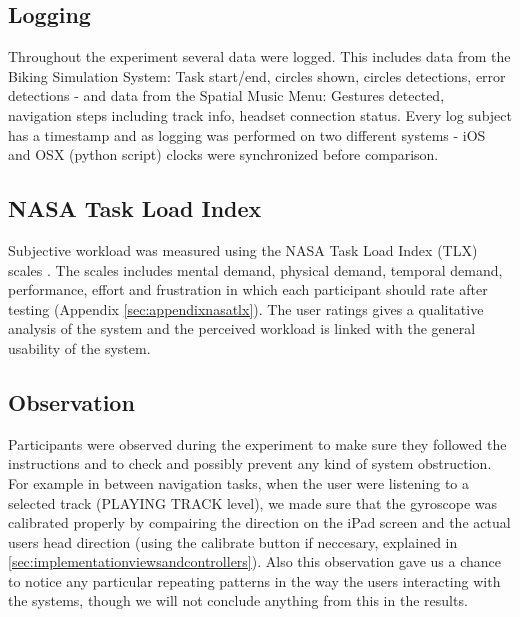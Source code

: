 \subsection{Logging}
Throughout the experiment several data were logged. This includes data from the Biking Simulation System: Task start/end, circles shown, circles detections, error detections - and data from the Spatial Music Menu: Gestures detected, navigation steps including track info, headset connection status. Every log subject has a timestamp and as logging was performed on two different systems - iOS and OSX (python script) clocks were synchronized before comparison.



\subsection{NASA Task Load Index}
Subjective workload was measured using the NASA Task Load Index (TLX) scales \cite{hart_workload_1990}. The scales includes mental demand, physical demand, temporal demand, performance, effort and frustration in which each participant should rate after testing (Appendix \ref{sec:appendixnasatlx}). The user ratings gives a qualitative analysis of the system and the perceived workload is linked with the general usability of the system.

\subsection{Observation}
Participants were observed during the experiment to make sure they followed the instructions and to check and possibly prevent any kind of system obstruction. For example in between navigation tasks, when the user were listening to a selected track (PLAYING TRACK level), we made sure that the gyroscope was calibrated properly by compairing the direction on the iPad screen and the actual users head direction (using the calibrate button if neccesary, explained in \ref{sec:implementationviewsandcontrollers}). Also this observation gave us a chance to notice any particular repeating patterns in the way the users interacting with the systems, though we will not conclude anything from this in the results.


